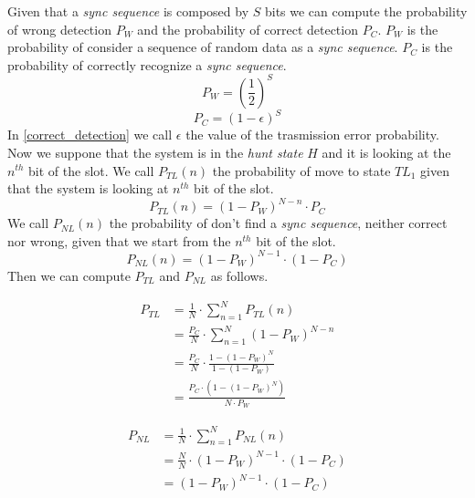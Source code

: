 Given that a \textit{sync sequence} is composed by $S$ bits we can compute the probability of wrong detection $P_W$ and the probability of correct detection $P_C$. $P_W$ is the probability of consider a sequence of random data as a \textit{sync sequence}. $P_C$ is the probability of correctly recognize a \textit{sync sequence}.
\begin{equation}
	P_W= \left( \frac{1}{2} \right) ^{S}
	\label{wrong_detection}
\end{equation}
\begin{equation}
	P_C= \left( 1-\epsilon \right) ^{S}
	\label{correct_detection}
\end{equation}
In \eqref{correct_detection} we call $\epsilon$ the value of the trasmission error probability.
Now we suppone that the system is in the \textit{hunt state} $H$ and it is looking at the $n^{th}$ bit of the slot. We call $P_{TL}(n)$ the probability of move to state $TL_1$ given that the system is looking at $n^{th}$ bit of the slot.
\begin{equation}
	P_{TL}(n) = (1-P_W)^{N-n} \cdot P_C
\end{equation}
We call $P_{NL}(n)$ the probability of don't find a \textit{sync sequence}, neither correct nor wrong, given that we start from the $n^{th}$ bit of the slot.
\begin{equation}
	P_{NL}(n) = (1-P_W)^{N-1} \cdot (1-P_C)
\end{equation}
Then we can compute $P_{TL}$ and $P_{NL}$ as follows.

\begin{equation}
\begin{split}
	P_{TL} & = \frac{1}{N} \cdot \sum_{n=1}^{N} P_{TL}(n) \\
	& = \frac{P_C}{N} \cdot \sum_{n=1}^{N} (1-P_{W})^{N-n} \\
	& = \frac{P_C}{N} \cdot \frac{1-(1-P_W)^N}{1-(1-P_W)} \\
	& = \frac{P_C \cdot (1 - (1-P_W)^N ) } { N \cdot P_W}
\end{split}
\end{equation}

\begin{equation}
\begin{split}
	P_{NL} & = \frac{1}{N} \cdot \sum_{n=1}^{N} P_{NL}(n) \\
	& = \frac{N}{N} \cdot (1-P_W)^{N-1} \cdot (1-P_C) \\
	& = (1-P_W)^{N-1} \cdot (1-P_C)
\end{split}
\end{equation}

